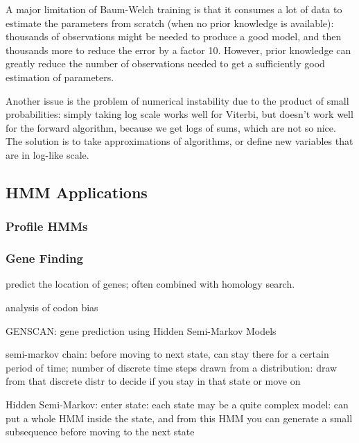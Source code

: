 A major limitation of Baum-Welch training is that it consumes a lot of data to estimate the parameters from scratch (when no prior knowledge is available): thousands of observations might be needed to produce a good model, and then thousands more to reduce the error by a factor 10. However, prior knowledge can greatly reduce the number of observations needed to get a sufficiently good estimation of parameters.

Another issue is the problem of numerical instability due to the product of small probabilities: simply taking log scale works well for Viterbi, but doesn't work well for the forward algorithm, because we get logs of sums, which are not so nice.
The solution is to take approximations of algorithms, or define new variables that are in log-like scale.



\subsection{HMM Applications}

\subsubsection{Profile HMMs}

\subsubsection{Gene Finding}

predict the location of genes; often combined with homology search.

analysis of codon bias

GENSCAN: gene prediction using Hidden Semi-Markov Models

semi-markov chain:
before moving to next state, can stay there for a certain period of time; number of discrete time steps drawn from a distribution:
draw from that discrete distr to decide if you stay in that state or move on

Hidden Semi-Markov:
enter state: each state may be a quite complex model:
can put a whole HMM inside the state, and from this HMM you can generate a small subsequence before moving to the next state

